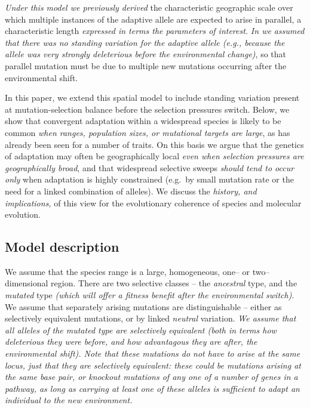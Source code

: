 \documentclass{article}
\newcommand{\gc}[1]{{\it\color{blue}#1}}
\newcommand{\mfp}[1]{{\it\color{red}#1}}
\begin{document}
\gc{Under this model we previously derived} the characteristic geographic scale over which 
multiple instances of the adaptive allele are expected to arise in parallel, 
a characteristic length \mfp{expressed in terms the parameters of interest.} 
\gc{In \citet{ralphcoop2010} we assumed that there was no standing variation for the adaptive
allele (e.g., because the allele was very strongly deleterious before the environmental change)}, 
so that parallel mutation must be due to multiple new mutations occurring after the environmental shift. 

In this paper, we extend this spatial model to include standing variation 
present at mutation-selection balance before the selection pressures switch.
Below,
we show that convergent adaptation within a widespread species is likely to be
common \gc{when ranges, population sizes, or mutational targets are large}, as has already been seen for a number of traits. 
On this basis we argue 
that the genetics of adaptation may often be geographically local \gc{even
when selection pressures are geographically broad}, 
and that widespread selective sweeps \mfp{should tend to occur only}
when adaptation is highly constrained (e.g.\ by small mutation rate or
the need for a linked combination of alleles).
We discuss the \gc{history, and implications,} of this view for the evolutionary
coherence of species and molecular evolution.

\subsection{Model description}


We assume that the species range
is a large, homogeneous, one-- or two--dimensional region. 
There are two selective classes -- the \gc{\textit{ancestral}} type,
and the {\em mutated} type \gc{(which will offer a fitness benefit after the
environmental switch)}.
We assume that separately arising mutations are distinguishable --
either as selectively equivalent mutations, or by linked \gc{neutral} variation.
\gc{We assume that all alleles of the mutated type are selectively
equivalent (both in terms how deleterious they were before, and how
advantagous they are after, the environmental shift). 
Note that these mutations do not have to arise at the same locus,
just that they are selectively equivalent:
these could be mutations arising at the same base pair, 
or knockout mutations of any one of a number of genes in a pathway,
as long as carrying at least one of these alleles
is sufficient to adapt an individual to the new environment.}
\end{document}
